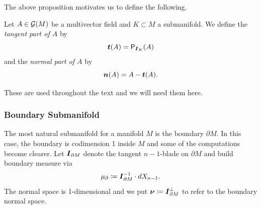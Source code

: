 \documentclass{article}
\begin{document}
The above proposition motivates us to define the following.
\begin{definition}
Let $A\in \mathcal{G}(M)$ be a multivector field and $K\subset M$ a submanifold. We define the \emph{tangent part of $A$} by
\begin{equation}
    \boldsymbol{t}(A) = \mathsf{P}_{\boldsymbol{I}_K}(A)
\end{equation}
and the \emph{normal part of $A$} by
\begin{equation}
\label{eq:normalpart_def}
    \boldsymbol{n}(A) = A - \boldsymbol{t}(A).
\end{equation}
\end{definition}
These are used throughout the text \cite{schwarz_hodge_1995} and we will need them here.

\subsubsection{Boundary Submanifold}

The most natural submanifold for a manifold $M$ is the boundary $\partial M$. In this case, the boundary is codimension 1 inside $M$ and some of the computations become clearer. Let $\boldsymbol{I}_{\partial M}$ denote the tangent $n-1$-blade on $\partial M$ and build boundary measure via
\begin{equation}
\mu_\partial \coloneqq \boldsymbol{I}_{\partial M}^{-1} \cdot dX_{n-1}.
\end{equation}
The normal space is 1-dimensional and we put $\boldsymbol{\nu}\coloneqq \boldsymbol{I}_{\partial M}^\perp $ to refer to the boundary normal space. 
\end{document}
